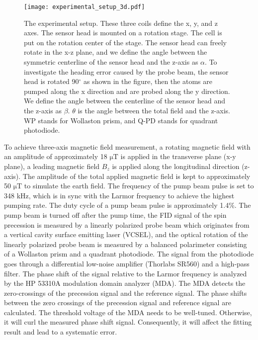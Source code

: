 \documentclass[prx,twocolumn,10pt,nofootinbib]{revtex4-1}
\begin{document}
 \begin{figure*}[!hbt]
 \centering
    \texttt{[image: experimental\_setup\_3d.pdf]}
    \caption{The experimental setup. These three coils define the x, y, and z axes. The sensor head is mounted on a rotation stage. The cell is put on the rotation center of the stage. The sensor head can freely rotate in the x-z plane, and we define the angle between the symmetric centerline of the sensor head and the z-axis as $\alpha$. To investigate the heading error caused by the probe beam, the sensor head is rotated 90$^{\circ}$ as shown in the figure, then the atoms are pumped along the x direction and are probed along the y direction. We define the angle between the centerline of the sensor head and the z-axis as $\beta$. $\theta$ is the angle between the total field and the z-axis. WP stands for Wollaston prism, and Q-PD stands for quadrant photodiode.}
    \label{fig:setup}	
 \end{figure*}
 
To achieve three-axis magnetic field measurement, a rotating magnetic field with an amplitude of approximately 18 $\mathrm{\mu T}$ is applied in the transverse plane (x-y plane), a leading magnetic field $B_z$ is applied along the longitudinal direction (z-axis). The amplitude of the total applied magnetic field is kept to approximately 50 $\mathrm{\mu T}$ to simulate the earth field. The frequency of the pump beam pulse is set to 348 kHz, which is in sync with the Larmor frequency to achieve the highest pumping rate. The duty cycle of a pump beam pulse is approximately 1.4\%. The pump beam is turned off after the pump time, the FID signal of the spin precession is measured by a linearly polarized probe beam which originates from a vertical cavity surface emitting laser (VCSEL), and the optical rotation of the linearly polarized probe beam is measured by a balanced polarimeter consisting of a Wollaston prism and a quadrant photodiode. The signal from the photodiode goes through a differential low-noise amplifier (Thorlabs SR560) and a high-pass filter. The phase shift of the signal relative to the Larmor frequency is analyzed by the HP 53310A modulation domain analyzer (MDA). The MDA detects the zero-crossings of the precession signal and the reference signal. The phase shifts between the zero crossings of the precession signal and reference signal are calculated. The threshold voltage of the MDA needs to be well-tuned. Otherwise, it will curl the measured phase shift signal. Consequently, it will affect the fitting result and lead to a systematic error.
\end{document}
